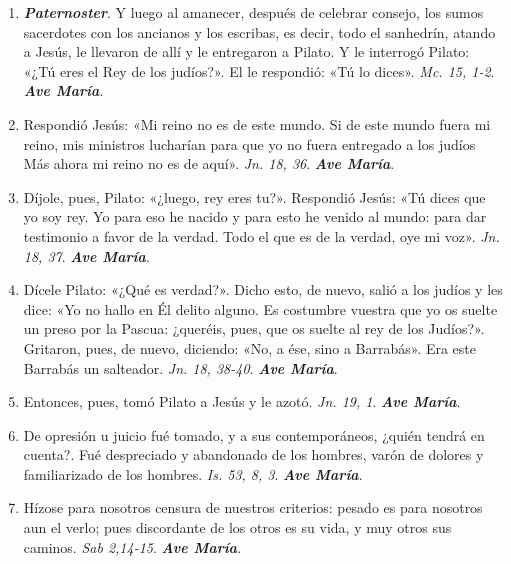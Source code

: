 \documentclass[../../devocionario.tex]{subfiles}
\begin{document}
    \begin{enumerate}
    
        \item \textbf{\textit{Paternoster}}. Y luego al amanecer, después de celebrar consejo, los sumos sacerdotes con los ancianos y los escribas, 
            es decir, todo el sanhedrín, atando a Jesús, le llevaron de allí y le entregaron a Pilato. 
            Y le interrogó Pilato: «¿Tú eres el Rey de los judíos?». El le respondió: «Tú lo dices». \textit{Mc. 15, 1-2}. \textbf{\textit{Ave María}}.

        \item Respondió Jesús: «Mi reino no es de este mundo. Si de este mundo fuera mi reino, mis ministros lucharían para 
            que yo no fuera entregado a los judíos Más ahora mi reino no es de aquí». \textit{Jn. 18, 36}. \textbf{\textit{Ave María}}.

        \item Díjole, pues, Pilato: «¿luego, rey eres tu?». Respondió Jesús: «Tú dices que yo soy rey. Yo para eso he nacido y 
            para esto he venido al mundo: para dar testimonio a favor de la verdad. 
            Todo el que es de la verdad, oye mi voz». \textit{Jn. 18, 37}. \textbf{\textit{Ave María}}.

        \item Dícele Pilato: «¿Qué es verdad?». Dicho esto, de nuevo, salió a los judíos y les dice: 
            «Yo no hallo en Él delito alguno. Es costumbre vuestra que yo os suelte un preso por la Pascua: ¿queréis, pues, 
            que os suelte al rey de los Judíos?». Gritaron, pues, de nuevo, diciendo: «No, a ése, sino a Barrabás». 
            Era este Barrabás un salteador. \textit{Jn. 18, 38-40}. \textbf{\textit{Ave María}}.

        \item Entonces, pues, tomó Pilato a Jesús y le azotó. \textit{Jn. 19, 1}. \textbf{\textit{Ave María}}.

        \item De opresión u juicio fué tomado, y a sus contemporáneos, ¿quién tendrá en cuenta?. Fué despreciado y abandonado de los hombres, 
            varón de dolores y familiarizado de los hombres. \textit{Is. 53, 8, 3}. \textbf{\textit{Ave María}}.

        \item Hízose para nosotros censura de nuestros criterios: pesado es para nosotros aun el verlo; 
            pues discordante de los otros es su vida, y muy otros sus caminos. \textit{Sab 2,14-15}. \textbf{\textit{Ave María}}.


\end{enumerate}
\end{document}
